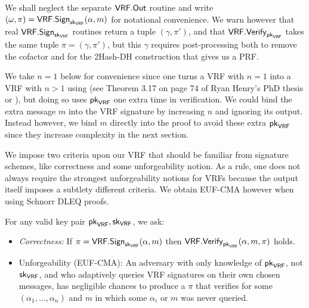 We shall neglect the separate $\mathsf{VRF}.\mathsf{Out}$ routine and write $(\omega,\pi) = \mathsf{VRF}.\mathsf{Sign}_{\mathsf{sk}_{\mathsf{VRF}}}(\alpha,m)$ for notational convenience.  We warn however that real $\mathsf{VRF}.\mathsf{Sign}_{\mathsf{sk}_{\mathsf{VRF}}}$ routines return a tuple $(\gamma,\pi')$, and that $\mathsf{VRF}.\mathsf{Verify}_{\mathsf{pk}_{\mathsf{VRF}}}$ takes the same tuple $\pi = (\gamma,\pi')$, but this $\gamma$ requires post-processing both to remove the cofactor and for the 2Hash-DH construction that gives us a PRF.

We take $n=1$ below for convenience since one turns a VRF with $n=1$ into a VRF with $n>1$ using 
\cite[\S3.2.1]{PrivacyPass} (see Theorem 3.17 on page 74 of Ryan Henry's PhD thesis \cite{RyanHenryPhD} or \cite{HenryGoldberg13}), but doing so uses $\mathsf{pk}_{\mathsf{VRF}}$ one extra time in verification.  
We could bind the extra message $m$ into the VRF signature by increasing $n$ and ignoring its output.  Instead however, we bind $m$ directly into the proof to avoid these extra $\mathsf{pk}_{\mathsf{VRF}}$ since they increase complexity in the next section.

We impose two criteria upon our VRF that should be familiar from signature schemes, like correctness and some unforgeability notion.  As a rule, one does not always require the strongest unforgeability notions for VRFs because the output itself imposes a subtlety different criteria.  We obtain EUF-CMA however when using Schnorr DLEQ proofs. 

For any valid key pair $\mathsf{pk}_{\mathsf{VRF}},\mathsf{sk}_{\mathsf{VRF}}$, we ask:
\begin{itemize}
\item {\em Correctness:}
If $\pi = \mathsf{VRF}.\mathsf{Sign}_{\mathsf{sk}_{\mathsf{VRF}}}(\alpha,m)$ then $\mathsf{VRF}.\mathsf{Verify}_{\mathsf{pk}_{\mathsf{VRF}}}(\alpha,m,\pi)$ holds.
\item {\rm Unforgeability (EUF-CMA):} 
An adversary with only knowledge of $\mathsf{pk}_{\mathsf{VRF}}$, not $\mathsf{sk}_{\mathsf{VRF}}$, and who adaptively queries VRF signatures on their own chosen messages, has negligible chances to produce a $\pi$ that verifies for some $(\alpha_1,\ldots,\alpha_n)$ and $m$ in which some $\alpha_i$ or $m$ was never queried.
\end{itemize}

